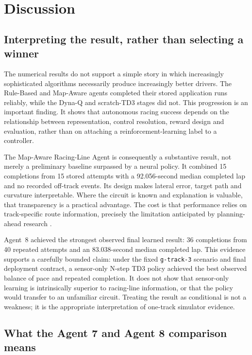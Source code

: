 \section{Discussion}
\label{ch:discussion}

\subsection{Interpreting the result, rather than selecting a winner}

The numerical results do not support a simple story in which increasingly sophisticated algorithms necessarily produce increasingly better drivers. The Rule-Based and Map-Aware agents completed their stored application runs reliably, while the Dyna-Q and scratch-TD3 stages did not. This progression is an important finding. It shows that autonomous racing success depends on the relationship between representation, control resolution, reward design and evaluation, rather than on attaching a reinforcement-learning label to a controller.

The Map-Aware Racing-Line Agent is consequently a substantive result, not merely a preliminary baseline surpassed by a neural policy. It combined 15 completions from 15 stored attempts with a 92.056-second median completed lap and no recorded off-track events. Its design makes lateral error, target path and curvature interpretable. Where the circuit is known and explanation is valuable, that transparency is a practical advantage. The cost is that performance relies on track-specific route information, precisely the limitation anticipated by planning-ahead research \parencite{quadflieg2010}.

Agent~8 achieved the strongest observed final learned result: 36 completions from 40 repeated attempts and an 83.038-second median completed lap. This evidence supports a carefully bounded claim: under the fixed \texttt{g-track-3} scenario and final deployment contract, a sensor-only N-step TD3 policy achieved the best observed balance of pace and repeated completion. It does not show that sensor-only learning is intrinsically superior to racing-line information, or that the policy would transfer to an unfamiliar circuit. Treating the result as conditional is not a weakness; it is the appropriate interpretation of one-track simulator evidence.

\subsection{What the Agent 7 and Agent 8 comparison means}

